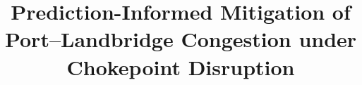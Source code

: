 \documentclass[a4paper,fleqn]{cas-sc}
\begin{document}
\let\WriteBookmarks\relax
\def\floatpagepagefraction{1}
\def\textpagefraction{.001}



\title [mode = title]{Prediction-Informed Mitigation of Port--Landbridge Congestion under Chokepoint Disruption}
\tnotemark[1,2]




%






\end{document}
